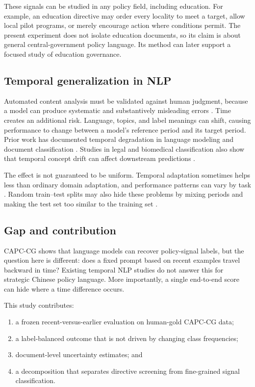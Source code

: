 \documentclass[11pt]{article}
\begin{document}
These signals can be studied in any policy field, including education. For example, an education directive may order every locality to meet a target, allow local pilot programs, or merely encourage action where conditions permit. The present experiment does not isolate education documents, so its claim is about general central-government policy language. Its method can later support a focused study of education governance.

\subsection{Temporal generalization in NLP}

Automated content analysis must be validated against human judgment, because a model can produce systematic and substantively misleading errors \cite{grimmer2013}. Time creates an additional risk. Language, topics, and label meanings can shift, causing performance to change between a model's reference period and its target period. Prior work has documented temporal degradation in language modeling and document classification \cite{lazaridou2021,luu2022,huang2019}. Studies in legal and biomedical classification also show that temporal concept drift can affect downstream predictions \cite{chalkidis2022}.

The effect is not guaranteed to be uniform. Temporal adaptation sometimes helps less than ordinary domain adaptation, and performance patterns can vary by task \cite{rottger2021}. Random train--test splits may also hide these problems by mixing periods and making the test set too similar to the training set \cite{sogaard2021}.

\subsection{Gap and contribution}

CAPC-CG shows that language models can recover policy-signal labels, but the question here is different: does a fixed prompt based on recent examples travel backward in time? Existing temporal NLP studies do not answer this for strategic Chinese policy language. More importantly, a single end-to-end score can hide where a time difference occurs.

This study contributes:

\begin{enumerate}
    \item a frozen recent-versus-earlier evaluation on human-gold CAPC-CG data;
    \item a label-balanced outcome that is not driven by changing class frequencies;
    \item document-level uncertainty estimates; and
    \item a decomposition that separates directive screening from fine-grained signal classification.
\end{enumerate}
\end{document}

